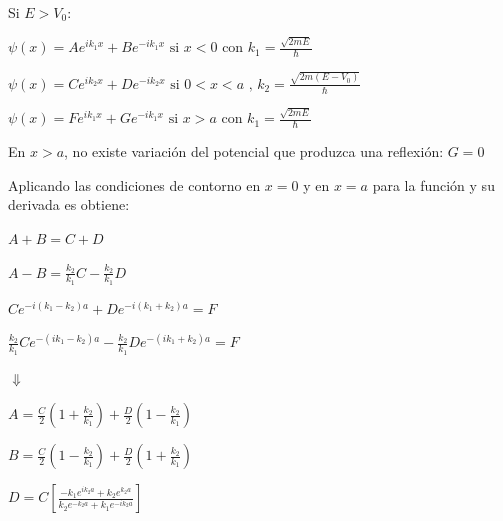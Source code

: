 \documentclass[oneside]{book}
\numberwithin{equation}{section}
\numberwithin{figure}{section}
\numberwithin{table}{section}
\begin{document}
				\begin{minipage}[t]{0.49\textwidth}	
				
				Si $E>V_0$:\\				
				
				\begin{center}
					$\displaystyle \psi(x)=Ae^{ik_1x}+Be^{-ik_1x} \text{ si } x<0 \text{ con } k_1=\frac{\sqrt{2mE}}{\hbar}$	
				\end{center}				
				\begin{center}
					$\displaystyle \psi(x)=Ce^{ik_2x}+De^{-ik_2x} \text{ si } 0<x<a \text{ , } k_2=\frac{\sqrt{2m(E-V_0)}}{\hbar}$	
				\end{center}			
				\begin{center}
					$\displaystyle \psi(x)=Fe^{ik_1x}+Ge^{-ik_1x} \text{ si } x>a \text{ con } k_1=\frac{\sqrt{2mE}}{\hbar}$	
				\end{center}			
				\begin{center}
					En $x>a$, no existe variación del potencial que produzca una reflexión: $G=0$
				\end{center}
				\begin{center}
					Aplicando	 las condiciones de contorno en $x=0$ y en $x=a$ para la función y su derivada es obtiene:
				\end{center}
				\begin{center}
					$\displaystyle A+B=C+D$	
				\end{center}		
				\begin{center}
					$\displaystyle A-B=\frac{k_2}{k_1}C-\frac{k_2}{k_1}D$	
				\end{center}		
				\begin{center}
					$\displaystyle Ce^{-i(k_1-k_2)a}+De^{-i(k_1+k_2)a}=F$	
				\end{center}		
				\begin{center}
					$\displaystyle \frac{k_2}{k_1}Ce^{-(ik_1-k_2)a}-\frac{k_2}{k_1}De^{-(ik_1+k_2)a}=F$	
				\end{center}		
				\begin{center}
					$\Downarrow$
				\end{center}
				\begin{center}
					$\displaystyle A=\frac{C}{2}\left(1+\frac{k_2}{k_1}\right)+\frac{D}{2}\left(1-\frac{k_2}{k_1}\right)$	
				\end{center}		
				\begin{center}
					$\displaystyle B=\frac{C}{2}\left(1-\frac{k_2}{k_1}\right)+\frac{D}{2}\left(1+\frac{k_2}{k_1}\right)$	
				\end{center}		
				\begin{center}
					$\displaystyle D=C\left[\frac{-k_1e^{ik_2a}+k_2e^{k_2a}}{k_2e^{-k_2a}+k_1e^{-ik_2a}}\right]$	
				\end{center}		
				

\end{minipage}
\end{document}
